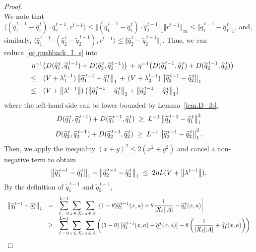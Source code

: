 \documentclass[12pt, final]{l4dc2023}
\begin{document}
\begin{proof}
\begin{equation}
	\end{equation}
	We note that $\langle{ (\tilde q_1^{\,t-1} -\hat q_1^{\,t} )\cdot \hat q_2^{\,t-1}},{r^{t-1}}\rangle \leq \Vert (\tilde q_1^{\,t-1} -\hat q_1^{\,t} )\cdot \hat q_2^{\,t-1}\Vert_1\Vert{r^{t-1}}\Vert_\infty\leq \Vert\tilde q_1^{\,t-1} -\hat q_1^{\,t} \Vert_1$, and, similarly, $\langle\hat q_1^{\,t-1}\cdot (\hat q_2^{\,t} - \tilde q_2^{\,t-1} ),{r^{t-1}}\rangle\leq\Vert\hat q_2^{\,t} - \tilde q_2^{\,t-1}\Vert_1$. Thus, we can reduce~\eqref{eq.pushback_I_s} into
	\[
	\begin{array}{rcl}
	&& \!\!\!\! \!\!\!\! \!\! 
	\eta^{-1} \big(D(\hat q_1^{\,t},\tilde q_1^{\,t-1}) + D(\hat q_2^{\,t}, \tilde q_2^{\,t-1})\big)
	\,+\,
	\eta^{-1} \big(D( \tilde q_1^{\,t-1},\hat q_1^{\,t}) + D( \tilde q_2^{\,t-1}, \hat q_2^{\,t}) \big)
	\\[0.2cm]
	&\leq&
	(V+\lambda_1^{t-1}) 
	\norm{ \tilde q_1^{\,t-1} - \hat q_1^{\,t} }_1
	\,+\,
	(V+\lambda_2^{t-1}) 
	\norm{ \tilde q_2^{\,t-1} - \hat q_2^{\,t}}_1
	\\[0.2cm]
	&\leq&
	(V+ \norm{\lambda^{t-1}}) 
	\left(
	\norm{ \tilde q_1^{\,t-1} - \hat q_1^{\,t} }_1
	+
	\norm{ \tilde q_2^{\,t-1} - \hat q_2^{\,t}}_1
	\right)
	\end{array}
	\]
	where the left-hand side can be lower bounded by Lemma~\ref{lem.D_lb}, 
	\[
	D(\widehat q_1^{\,t},\widetilde q_1^{\,t-1})+D( \widetilde q_1^{\,t-1},\widehat q_1^{\,t}) \;\geq\; L^{-1}\left\|{ \widetilde q_1^{\,t-1}-\widehat q_1^{\,t} }\right\|_1^2
	\]
	\[
	D(\widehat q_2^{\,t},\widetilde q_2^{\,t-1})+D( \widetilde q_2^{\,t-1},\widehat q_2^{\,t}) \;\geq\; L^{-1}\left\|{ \widetilde q_2^{\,t-1}-\widehat q_2^{\,t} }\right\|_1^2.
	\]
	Then, we apply the inequality $(x+y)^2\leq2(x^2+y^2) $ and cancel a non-negative term to obtain
	\begin{equation}\label{eq.qq_dual_s}
	\left\|{ \widetilde q_1^{\,t-1}-\widehat q_1^{\,t} }\right\|_1 + \left\|{ \widetilde q_2^{\,t-1}-\widehat q_2^{\,t} }\right\|_1
	\;\leq\;
	2\eta  L (V + \left\|{\lambda^{t-1}}\right\|).
	\end{equation}
	By the definition of $\tilde q_1^{\,t-1}$ and $\tilde q_2^{\,t-1}$,
	\[
	\begin{array}{rcl}
	\left\|{ \widetilde q_1^{\,t-1}-\widehat q_1^{\,t} }\right\|_1 
	&=&\displaystyle
	\sum_{\ell\,=\,0}^{L-1}\sum_{x\,\in\,X_\ell} \sum_{a\,\in\,A}
	\left|
		(1-\theta)\widehat {q}_1^{\,t-1}(x,a)+\theta\frac{1}{|X_\ell||A|} - \widehat q_1^{\,t}(x,a)
	\right|
	\\[0.2cm]
	&\geq&\displaystyle
	\sum_{\ell\,=\,0}^{L-1}\sum_{x\,\in\,X_\ell} \sum_{a\,\in\,A}
	\left(
		(1-\theta)  \left|
			\widehat {q}_1^{\,t-1}(x,a)- \widehat q_1^{\,t}(x,a)
		\right| -\theta \left(\frac{1}{|X_\ell||A|} + \widehat q_1^{\,t}(x,a)\right)
\right)
\end{array}\]
\end{proof}
\end{document}
